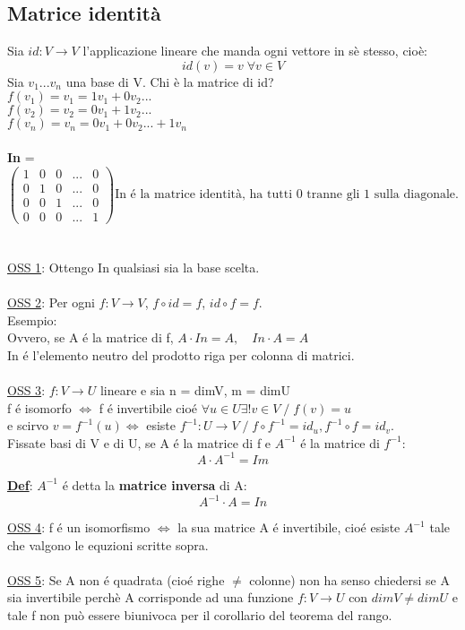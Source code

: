 \documentclass[12pt]{article}
\begin{document}
\subsection{Matrice identità}
Sia $id: V\longrightarrow V$ l'applicazione lineare che manda ogni vettore in sè stesso, cioè:
$$id(v) = v \;\forall v \in V$$
Sia $v_1...v_n$ una base di V. Chi è  la matrice di id?\\
$f(v_1) = v_1= 1v_1+0v_2...$\\
$f(v_2) = v_2 = 0v_1 + 1v_2...$\\
$f(v_n) = v_n = 0v_1 + 0v_2 ... + 1v_n$\\\\
\textbf{In} = $\begin{pmatrix}
    1 & 0 & 0 &... & 0\\
    0 & 1 & 0 &... & 0\\
    0 & 0 & 1 &... & 0\\
    0 & 0 & 0 &... & 1
\end{pmatrix}
\text{In é la matrice identità, ha tutti 0 tranne gli 1 sulla diagonale.}
$
\\\\\\
\underline{OSS 1}: Ottengo In qualsiasi sia la base scelta.\\\\
\underline{OSS 2}: Per ogni $f:V \longrightarrow V$, $f\circ id = f$, $id \circ f = f$.\\
Esempio:\\
Ovvero, se A é la matrice di f, $A \cdot In = A, \quad In\cdot A = A$\\
In é l'elemento neutro del prodotto riga per colonna di matrici.\\\\
\underline{OSS 3}: $f:V\longrightarrow U$ lineare e sia n = dimV, m = dimU\\
f é isomorfo $\iff$ f é invertibile cioé $\forall u \in U \exists! v\in V \;/\; f(v) = u$\\
e scirvo $v = f^{-1}(u) \iff$ esiste $f^{-1}:U\longrightarrow V \;/\; f\circ f^{-1} = id_u, f^{-1}\circ f = id_v$.\\
Fissate basi di V e di U, se A é la matrice di f e $A^{-1}$ é la matrice di $f^{-1}$:
$$A\cdot A^{-1} = Im$$

\noindent \textbf{\underline{Def}}: $A^{-1}$ é detta la \textbf{matrice inversa} di A:
$$A^{-1}\cdot A = In$$

\noindent \underline{OSS 4}: f é un isomorfismo $\iff$ la sua matrice A é invertibile, cioé esiste $A^{-1}$ tale che valgono le equzioni scritte sopra.\\\\
\underline{OSS 5}: Se A non é quadrata (cioé righe $\neq$ colonne) non ha senso chiedersi se A sia invertibile perchè A corrisponde ad una funzione $f:V \longrightarrow U$ con $dimV \neq dimU$ e tale f non può essere biunivoca per il corollario del teorema del rango.\\
\end{document}
